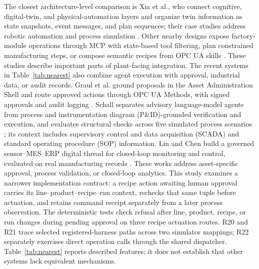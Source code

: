 The closest architecture-level comparison is Xia et al., who connect cognitive,
digital-twin, and physical-automation layers and organize twin information as
state snapshots, event messages, and plan sequences; their case studies
address robotic automation and process simulation
\cite{xia2025architecture}. Other nearby designs expose factory-module
operations through MCP with state-based tool filtering, plan constrained
manufacturing steps, or compose semantic recipes from OPC UA skills
\cite{koehle2026llmdriven,silva2025mcpmanufacturing,koehle2025semanticrecipes}.
These studies describe important parts of plant-facing integration. The
recent systems in Table~\ref{tab:nearest} also combine agent execution with
approval, industrial data, or audit records. Graul et al. ground proposals in
the Asset Administration Shell and route approved actions through OPC UA
Methods, with signed approvals and audit logging
\cite{graul2026aas}. Schall separates advisory language-model agents from
process and instrumentation diagram (P\&ID)-grounded verification and
execution, and evaluates structural checks across five simulated process
scenarios \cite{schall2026safe}; its context includes supervisory control and
data acquisition (SCADA) and standard operating procedure (SOP) information.
Lin and Chen build a governed sensor--MES--ERP digital thread for closed-loop
monitoring and control, evaluated on real manufacturing
records \cite{lin2026agentic}. These works address asset-specific approval,
process validation, or closed-loop analytics. This study examines a narrower
implementation contract: a recipe action awaiting human approval carries its
line--product--recipe--run context, rechecks that same tuple before actuation,
and retains command receipt separately from a later process observation. The
deterministic tests check refusal after line, product, recipe, or run changes
during pending approval on three recipe actuation routes. R20 and R21 trace
selected registered-harness paths across two simulator mappings; R22
separately exercises direct operation calls through the shared dispatcher.
Table~\ref{tab:nearest} reports described features; it does not establish that
other systems lack equivalent mechanisms.
